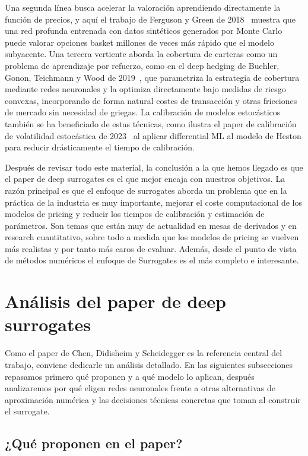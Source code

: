 \documentclass[11pt,a4paper]{article}
\begin{document}
Una segunda línea busca acelerar la valoración aprendiendo directamente la función de precios, y aquí el trabajo de Ferguson y Green de 2018~\cite{ferguson2018} muestra que una red profunda entrenada con datos sintéticos generados por Monte Carlo puede valorar opciones basket millones de veces más rápido que el modelo subyacente. Una tercera vertiente aborda la cobertura de carteras como un problema de aprendizaje por refuerzo, como en el deep hedging de Buehler, Gonon, Teichmann y Wood de 2019~\cite{buehler2019}, que parametriza la estrategia de cobertura mediante redes neuronales y la optimiza directamente bajo medidas de riesgo convexas, incorporando de forma natural costes de transacción y otras fricciones de mercado sin necesidad de griegas. La calibración de modelos estocásticos también se ha beneficiado de estas técnicas, como ilustra el paper de calibración de volatilidad estocástica de 2023~\cite{dlcalib2023} al aplicar differential ML al modelo de Heston para reducir drásticamente el tiempo de calibración.

Después de revisar todo este material, la conclusión a la que hemos llegado es que el paper de deep surrogates es el que mejor encaja con nuestros objetivos. La razón principal es que el enfoque de surrogates aborda un problema que en la práctica de la industria es muy importante, mejorar el coste computacional de los modelos de pricing y reducir los tiempos de calibración y estimación de parámetros. Son temas que están muy de actualidad en mesas de derivados y en research cuantitativo, sobre todo a medida que los modelos de pricing se vuelven más realistas y por tanto más caros de evaluar. Además, desde el punto de vista de métodos numéricos el enfoque de Surrogates es el más completo e interesante.

\section{Análisis del paper de deep surrogates}

Como el paper de Chen, Didisheim y Scheidegger es la referencia central del trabajo, conviene dedicarle un análisis detallado. En las siguientes subsecciones repasamos primero qué proponen y a qué modelo lo aplican, después analizaremos por qué eligen redes neuronales frente a otras alternativas de aproximación numérica y las decisiones técnicas concretas que toman al construir el surrogate.

\subsection{¿Qué proponen en el paper?}
\end{document}
